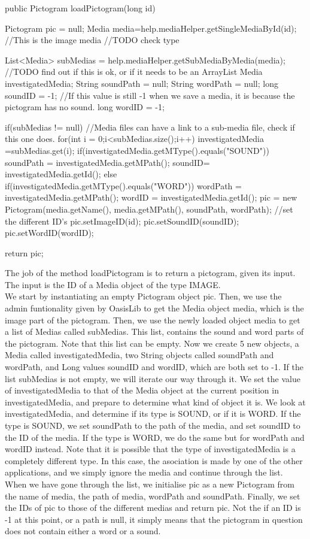 \begin{source}{}
	public Pictogram loadPictogram(long id)
	{
		Pictogram pic = null;
		Media media=help.mediaHelper.getSingleMediaById(id); //This is the image media //TODO check type

		List<Media> subMedias =	help.mediaHelper.getSubMediaByMedia(media); //TODO find out if this is ok, or if it needs to be an ArrayList
		Media investigatedMedia;
		String soundPath = null;
		String wordPath = null;
		long soundID = -1; //If this value is still -1 when we save a media, it is because the pictogram has no sound.
		long wordID = -1;

		if(subMedias != null)	//Media files can have a link to a sub-media file, check if this one does.
		{
			for(int i = 0;i<subMedias.size();i++) 		
			{
				investigatedMedia =subMedias.get(i);
				if(investigatedMedia.getMType().equals("SOUND"))
				{
					soundPath = investigatedMedia.getMPath();
					soundID= investigatedMedia.getId();
				}
				else if(investigatedMedia.getMType().equals("WORD"))
				{
					wordPath = investigatedMedia.getMPath();
					wordID = investigatedMedia.getId();
				}
			}
		}
		pic = new Pictogram(media.getName(), media.getMPath(), soundPath, wordPath);
		//set the different ID's
		pic.setImageID(id);
		pic.setSoundID(soundID);
		pic.setWordID(wordID);

		return pic;
	}

\end{source}
The job of the method loadPictogram is to return a pictogram, given its input. The input is the ID of a Media object of the type IMAGE.\\
We start by instantiating an empty Pictogram object pic.
Then, we use the admin funtionality given by OasisLib to get the Media object media, which is the image part of the pictogram.
Then, we use the newly loaded object media to get a list of Medias called subMedias.
This list, contains the sound and word parts of the pictogram.
Note that this list can be empty.
Now we create 5 new objects, a Media called investigatedMedia, two String objects called soundPath and wordPath, and Long values soundID and wordID, which are both set to -1.
If the list subMedias is not empty, we will iterate our way through it.
We set the value of investigatedMedia to that of the Media object at the current position in investigatedMedia, and prepare to determine what kind of object it is.
We look at investigatedMedia, and determine if its type is SOUND, or if it is WORD.
If the type is SOUND, we set soundPath to the path of the media, and set soundID to the ID of the media.
If the type is WORD, we do the same but for wordPath and wordID instead.
Note that it is possible that the type of investigatedMedia is a completely different type. In this case, the asociation is made by one of the other applications, and we simply ignore the media and continue through the list.
When we have gone through the list, we initialise pic as a new Pictogram from the name of media, the path of media, wordPath and soundPath.
Finally, we set the IDs of pic to those of the different medias and return pic.\newline
Not the if an ID is -1 at this point, or a path is null, it simply means that the pictogram in question does not contain either a word or a sound.

